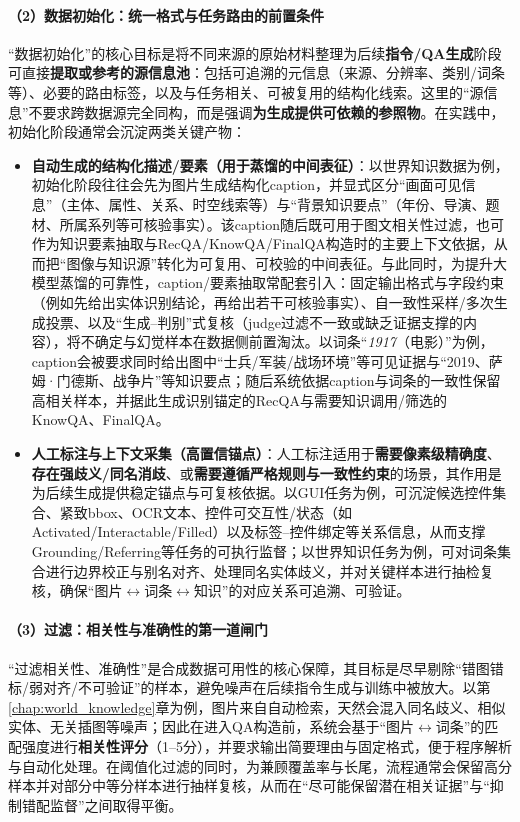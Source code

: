 \paragraph{（2）数据初始化：统一格式与任务路由的前置条件}
“数据初始化”的核心目标是将不同来源的原始材料整理为后续\textbf{指令/QA生成}阶段可直接\textbf{提取或参考的源信息池}：包括可追溯的元信息（来源、分辨率、类别/词条等）、必要的路由标签，以及与任务相关、可被复用的结构化线索。这里的“源信息”不要求跨数据源完全同构，而是强调\textbf{为生成提供可依赖的参照物}。在实践中，初始化阶段通常会沉淀两类关键产物：
\begin{itemize}
  \item \textbf{自动生成的结构化描述/要素（用于蒸馏的中间表征）}：以世界知识数据为例，初始化阶段往往会先为图片生成结构化caption，并显式区分“画面可见信息”（主体、属性、关系、时空线索等）与“背景知识要点”（年份、导演、题材、所属系列等可核验事实）。该caption随后既可用于图文相关性过滤，也可作为知识要素抽取与RecQA/KnowQA/FinalQA构造时的主要上下文依据，从而把“图像与知识源”转化为可复用、可校验的中间表征。与此同时，为提升大模型蒸馏的可靠性，caption/要素抽取常配套引入：固定输出格式与字段约束（例如先给出实体识别结论，再给出若干可核验事实）、自一致性采样/多次生成投票、以及“生成--判别”式复核（judge过滤不一致或缺乏证据支撑的内容），将不确定与幻觉样本在数据侧前置淘汰。以词条“\emph{1917}（电影）”为例，caption会被要求同时给出图中“士兵/军装/战场环境”等可见证据与“2019、萨姆·门德斯、战争片”等知识要点；随后系统依据caption与词条的一致性保留高相关样本，并据此生成识别锚定的RecQA与需要知识调用/筛选的KnowQA、FinalQA。
  \item \textbf{人工标注与上下文采集（高置信锚点）}：人工标注适用于\textbf{需要像素级精确度}、\textbf{存在强歧义/同名消歧}、或\textbf{需要遵循严格规则与一致性约束}的场景，其作用是为后续生成提供稳定锚点与可复核依据。以GUI任务为例，可沉淀候选控件集合、紧致bbox、OCR文本、控件可交互性/状态（如Activated/Interactable/Filled）以及标签--控件绑定等关系信息，从而支撑Grounding/Referring等任务的可执行监督；以世界知识任务为例，可对词条集合进行边界校正与别名对齐、处理同名实体歧义，并对关键样本进行抽检复核，确保“图片$\leftrightarrow$词条$\leftrightarrow$知识”的对应关系可追溯、可验证。
\end{itemize}

\paragraph{（3）过滤：相关性与准确性的第一道闸门}
“过滤相关性、准确性”是合成数据可用性的核心保障，其目标是尽早剔除“错图错标/弱对齐/不可验证”的样本，避免噪声在后续指令生成与训练中被放大。以第\ref{chap:world_knowledge}章为例，图片来自自动检索，天然会混入同名歧义、相似实体、无关插图等噪声；因此在进入QA构造前，系统会基于“图片$\leftrightarrow$词条”的匹配强度进行\textbf{相关性评分}（1--5分），并要求输出简要理由与固定格式，便于程序解析与自动化处理。在阈值化过滤的同时，为兼顾覆盖率与长尾，流程通常会保留高分样本并对部分中等分样本进行抽样复核，从而在“尽可能保留潜在相关证据”与“抑制错配监督”之间取得平衡。

